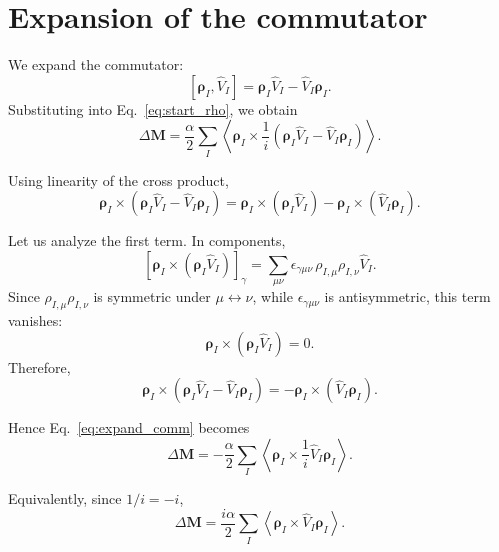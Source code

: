 \documentclass[11pt]{article}
\begin{document}
\section{Expansion of the commutator}

We expand the commutator:
\begin{equation}
\left[
\bm{\rho}_I,\hat V_I
\right]
=
\bm{\rho}_I \hat V_I - \hat V_I \bm{\rho}_I .
\end{equation}
Substituting into Eq.~\eqref{eq:start_rho}, we obtain
\begin{equation}
\Delta \mathbf{M}
=
\frac{\alpha}{2}
\sum_I
\left\langle
\bm{\rho}_I \times \frac{1}{i}
\left(
\bm{\rho}_I \hat V_I - \hat V_I \bm{\rho}_I
\right)
\right\rangle .
\label{eq:expand_comm}
\end{equation}

Using linearity of the cross product,
\begin{equation}
\bm{\rho}_I \times
\left(
\bm{\rho}_I \hat V_I - \hat V_I \bm{\rho}_I
\right)
=
\bm{\rho}_I \times (\bm{\rho}_I \hat V_I)
-
\bm{\rho}_I \times (\hat V_I \bm{\rho}_I) .
\label{eq:cross_split}
\end{equation}

Let us analyze the first term. In components,
\begin{equation}
\left[\bm{\rho}_I \times (\bm{\rho}_I \hat V_I)\right]_\gamma
=
\sum_{\mu\nu}
\epsilon_{\gamma\mu\nu}
\,\rho_{I,\mu}\rho_{I,\nu}\hat V_I .
\end{equation}
Since $\rho_{I,\mu}\rho_{I,\nu}$ is symmetric under $\mu \leftrightarrow \nu$, while $\epsilon_{\gamma\mu\nu}$ is antisymmetric, this term vanishes:
\begin{equation}
\bm{\rho}_I \times (\bm{\rho}_I \hat V_I)=0 .
\end{equation}
Therefore,
\begin{equation}
\bm{\rho}_I \times
\left(
\bm{\rho}_I \hat V_I - \hat V_I \bm{\rho}_I
\right)
=
-
\bm{\rho}_I \times (\hat V_I \bm{\rho}_I) .
\end{equation}

Hence Eq.~\eqref{eq:expand_comm} becomes
\begin{equation}
\Delta \mathbf{M}
=
-\frac{\alpha}{2}
\sum_I
\left\langle
\bm{\rho}_I \times \frac{1}{i}\hat V_I \bm{\rho}_I
\right\rangle .
\label{eq:generic_form}
\end{equation}

Equivalently, since $1/i=-i$,
\begin{equation}
\Delta \mathbf{M}
=
\frac{i\alpha}{2}
\sum_I
\left\langle
\bm{\rho}_I \times \hat V_I \bm{\rho}_I
\right\rangle .
\label{eq:generic_form_i}
\end{equation}
\end{document}
